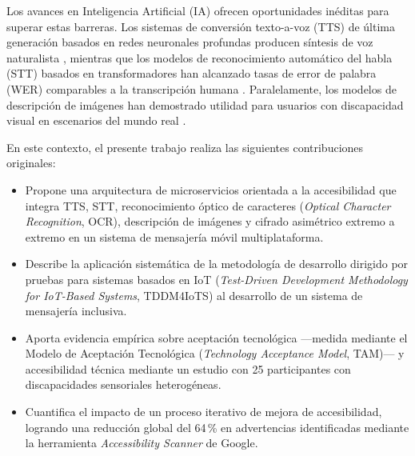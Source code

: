 \documentclass[journal]{IEEEtran}
\begin{document}
Los avances en Inteligencia Artificial (IA) ofrecen oportunidades in\'editas para superar estas barreras. Los sistemas de conversi\'on texto-a-voz (TTS) de \'ultima generaci\'on basados en redes neuronales profundas producen s\'intesis de voz naturalista \cite{tan2021}, mientras que los modelos de reconocimiento autom\'atico del habla (STT) basados en transformadores han alcanzado tasas de error de palabra (WER) comparables a la transcripci\'on humana \cite{baevski2020}. Paralelamente, los modelos de descripci\'on de im\'agenes han demostrado utilidad para usuarios con discapacidad visual en escenarios del mundo real \cite{dognin2021}.

En este contexto, el presente trabajo realiza las siguientes contribuciones originales:
\begin{itemize}
    \item Propone una arquitectura de microservicios orientada a la accesibilidad que integra TTS, STT, reconocimiento \'optico de caracteres (\textit{Optical Character Recognition}, OCR), descripci\'on de im\'agenes y cifrado asim\'etrico extremo a extremo en un sistema de mensajer\'ia m\'ovil multiplataforma.
    \item Describe la aplicaci\'on sistem\'atica de la metodolog\'ia de desarrollo dirigido por pruebas para sistemas basados en IoT (\textit{Test-Driven Development Methodology for IoT-Based Systems}, TDDM4IoTS) \cite{guerrero2020} al desarrollo de un sistema de mensajer\'ia inclusiva.
    \item Aporta evidencia emp\'irica sobre aceptaci\'on tecnol\'ogica ---medida mediante el Modelo de Aceptaci\'on Tecnol\'ogica (\textit{Technology Acceptance Model}, TAM)--- y accesibilidad t\'ecnica mediante un estudio con 25 participantes con discapacidades sensoriales heterog\'eneas.
    \item Cuantifica el impacto de un proceso iterativo de mejora de accesibilidad, logrando una reducci\'on global del 64\,\% en advertencias identificadas mediante la herramienta \textit{Accessibility Scanner} de Google.
\end{itemize}
\end{document}
